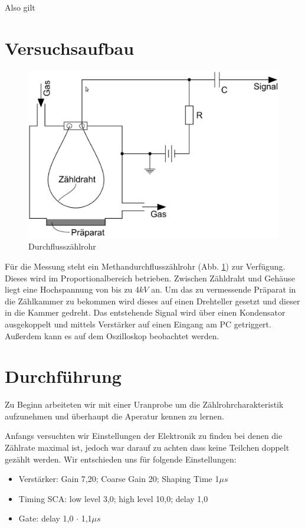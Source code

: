 \documentclass[12pt]{article}
\begin{document}
Also gilt 

\section{Versuchsaufbau}

\begin{figure}[H]  
\centering
\includegraphics[width=0.9\linewidth]{pictures/aufbau.eps}
\caption{Durchflusszählrohr}
\label{aufbau}
\end{figure}

Für die Messung steht ein Methandurchflusszählrohr (Abb. \ref{aufbau}) zur Verfügung.
Dieses wird im Proportionalbereich betrieben. Zwischen Zähldraht und Gehäuse liegt eine Hochspannung von bis zu 4$kV$ an.
Um das zu vermessende Präparat in die Zählkammer zu bekommen wird dieses auf einen Drehteller gesetzt und dieser in die Kammer gedreht.
Das entstehende Signal wird über einen Kondensator ausgekoppelt und mittels Verstärker auf einen Eingang am PC getriggert. Außerdem kann
es auf dem Oszilloskop beobachtet werden.

\section{Durchführung}
Zu Beginn arbeiteten wir mit einer Uranprobe um die Zählrohrcharakteristik aufzunehmen und überhaupt die Aperatur kennen zu lernen.

Anfangs versuchten wir Einstellungen der Elektronik zu finden bei denen die Zählrate maximal ist, jedoch war darauf zu achten dass keine Teilchen doppelt
gezählt werden. Wir entschieden uns für folgende Einstellungen:
\begin{itemize}
 \item Verstärker: Gain 7,20; Coarse Gain 20; Shaping Time 1$\mu s$
 \item Timing SCA: low level 3,0; high level 10,0; delay 1,0
 \item Gate: delay 1,0 $\cdot$ 1,1$\mu s$
\end{itemize}
\end{document}
